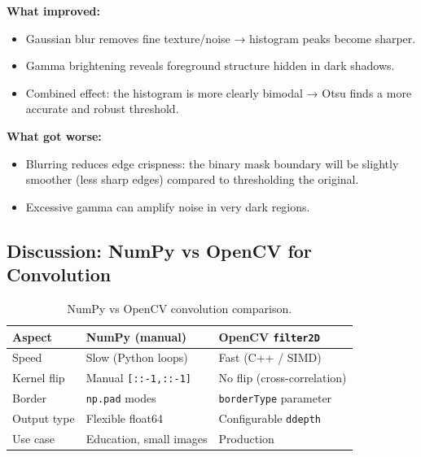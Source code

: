 \documentclass[12pt,a4paper]{article}
\begin{document}
\textbf{What improved:}
\begin{itemize}[leftmargin=*]
  \item Gaussian blur removes fine texture/noise → histogram peaks become sharper.
  \item Gamma brightening reveals foreground structure hidden in dark shadows.
  \item Combined effect: the histogram is more clearly bimodal → Otsu finds a
        more accurate and robust threshold.
\end{itemize}

\textbf{What got worse:}
\begin{itemize}[leftmargin=*]
  \item Blurring reduces edge crispness: the binary mask boundary will be slightly
        smoother (less sharp edges) compared to thresholding the original.
  \item Excessive gamma can amplify noise in very dark regions.
\end{itemize}

\subsection{Discussion: NumPy vs OpenCV for Convolution}

\begin{table}[H]
  \centering
  \begin{tabular}{@{}lll@{}}
    \toprule
    Aspect & NumPy (manual) & OpenCV \texttt{filter2D} \\
    \midrule
    Speed       & Slow (Python loops) & Fast (C++ / SIMD) \\
    Kernel flip & Manual \texttt{[::-1,::-1]} & No flip (cross-correlation) \\
    Border      & \texttt{np.pad} modes & \texttt{borderType} parameter \\
    Output type & Flexible float64 & Configurable \texttt{ddepth} \\
    Use case    & Education, small images & Production \\
    \bottomrule
  \end{tabular}
  \caption{NumPy vs OpenCV convolution comparison.}
\end{table}

\end{document}
